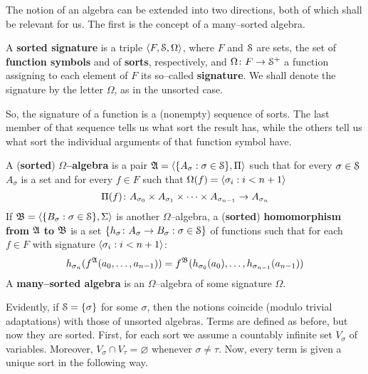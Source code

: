 The notion of an algebra can be extended into two directions, both
of which shall be relevant for us. The first is the concept of a
many--sorted algebra.
\begin{defn}
A \textbf{sorted signature} is a triple $\langle F, \mathcal{S}, \Omega\rangle$,
where $F$ and $\mathcal{S}$ are sets, the set of \textbf{function symbols}
and of \textbf{sorts}, respectively, and $\Omega \colon F \rightarrow \mathcal{S}^+$ a
function assigning to each element of $F$ its so--called 
\textbf{signature}. We shall denote the signature by the letter 
$\Omega$, as in the unsorted case.%
\end{defn}%
So, the signature of a function is a (nonempty) sequence of sorts.
The last member of that sequence tells us what sort the result
has, while the others tell us what sort the individual arguments
of that function symbol have.
\begin{defn}%
A (\textbf{sorted}) \textbf{$\Omega$--algebra} is a pair $\mathfrak{A} = \langle
\{A_{\sigma} : \sigma \in \mathcal{S}\}, \Pi\rangle$ such that for every
$\sigma \in \mathcal{S}$ $A_{\sigma}$ is a set and for every $f \in F$
such that $\Omega(f) = \langle \sigma_i : i < n+1\rangle$
\begin{equation}
\Pi(f) \colon A_{\sigma_0} \times A_{\sigma_1} \times \cdots \times
A_{\sigma_{n-1}} \rightarrow A_{\sigma_n} 
\end{equation}
If $\mathfrak{B} = \langle \{B_{\sigma} : \sigma \in \mathcal{S}\}, \Sigma\rangle$ is another 
$\Omega$--algebra, a (\textbf{sorted}) \textbf{homomorphism from} $\mathfrak{A}$ 
\textbf{to} $\mathfrak{B}$ is a set $\{h_{\sigma} \colon A_{\sigma} \rightarrow B_{\sigma} 
: \sigma \in \mathcal{S}\}$ of functions such that for each $f \in F$ with 
signature $\langle \sigma_i : i < n+1\rangle$:
\begin{equation}
h_{\sigma_n}(f^{\mathfrak{A}}(a_0, \dotsc, a_{n-1})) =
f^{\mathfrak{B}}(h_{\sigma_0}(a_0), \dotsc, h_{\sigma_{n-1}}(a_{n-1}))
\end{equation}
A \textbf{many--sorted algebra} is an $\Omega$--algebra of some
signature $\Omega$.
\end{defn}
Evidently, if $\mathcal{S} = \{\sigma\}$ for some $\sigma$, then the
notions coincide (modulo trivial adaptations) with those of
unsorted algebras. Terms are defined as before, but now they are 
sorted. First, for each sort we assume a countably infinite set 
$V_{\sigma}$ of variables. Moreover, $V_{\sigma} \cap V_{\tau} 
= \varnothing$ whenever $\sigma \neq \tau$. Now, every term is 
given a unique sort in the following way.
